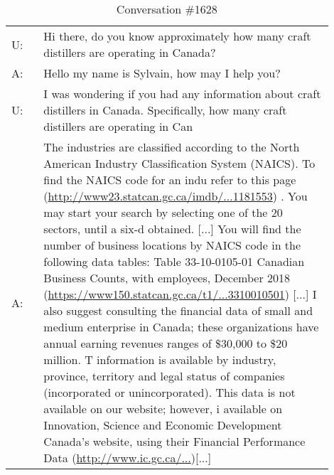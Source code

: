 \documentclass[11pt]{article}
\begin{document}
\begin{table*}[h]
    \small
    \centering
    \begin{tabular}{l p{0.9\linewidth}}
        \toprule
        U: & Hi there, do you know approximately how many craft distillers are operating in Canada?
        \\
        A: & Hello my name is Sylvain, how may I help you? 
        \\
        U: & I was wondering if you had any information about craft distillers in Canada. Specifically, how many craft distillers are operating in Can
        \\
        A: & The industries are classified according to the North American Industry Classification System (NAICS). To find the NAICS code for an indu refer to this page (\href{http://www23.statcan.gc.ca/imdb/p3VD.pl?Function=getVD&TVD=1181553}{http://www23.statcan.gc.ca/imdb/...1181553}) . You may start your search by selecting one of the 20 sectors, until a six-d obtained. [...] You will find the number of business locations by NAICS code in the following data tables: Table 33-10-0105-01 Canadian Business Counts, with employees, December 2018 (\href{https://www150.statcan.gc.ca/t1/tbl1/en/tv.action?pid=3310010501}{https://www150.statcan.gc.ca/t1/...3310010501}) [...] I also suggest consulting the financial data of small and medium enterprise in Canada; these organizations have annual earning revenues ranges of 
        \$30,000 to \$20 million. T information is available by industry, province, territory and legal status of companies (incorporated or unincorporated). This data is not available on our website; however, i available on Innovation, Science and Economic Development Canada’s website, using their Financial Performance Data (\href{http://www.ic.gc.ca/eic/site/pp-pp.nsf/eng/home}{http://www.ic.gc.ca/...})[...]
        \\
        \bottomrule

    \end{tabular}
    \caption{Conversation \#1628}
    \label{tab:sample_conversation_1628}
\end{table*}
\end{document}
